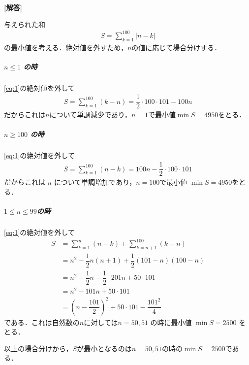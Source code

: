 \documentclass[../../main.tex]{subfiles}
\begin{document}
\begin{oframed}
  
\end{oframed}

{\bf [解答]}

与えられた和
\begin{align}
  S = \sum_{k=1}^{100} |n-k| \label{eq:1}
\end{align}
の最小値を考える．絶対値を外すため，$n$の値に応じて場合分けする．

\subparagraph{$n \le 1$ の時}

\cref{eq:1}の絶対値を外して
\begin{align}
  S
  = \sum_{k=1}^{100} (k-n)
  = \dfrac{1}{2} \cdot 100 \cdot 101 - 100 n
\end{align}
だからこれは$n$について単調減少であり，$n=1$で最小値$\min S = 4950$をとる．

\subparagraph{$n \ge 100$ の時}

\cref{eq:1}の絶対値を外して
\begin{align}
  S = \sum_{k=1}^{100} (n-k) = 100 n - \dfrac{1}{2} \cdot 100 \cdot 101
\end{align}
だからこれは $n$ について単調増加であり，$n=100$で最小値 $\min S = 4950$をとる．

\subparagraph{$1 \le n \le 99$の時}

\cref{eq:1}の絶対値を外して
\begin{align}
  S
  &= \sum_{k=1}^n (n-k) + \sum_{k=n+1}^{100} (k-n) \\
  &= n^2 - \dfrac{1}{2} n(n+1) + \dfrac{1}{2}(101-n)(100-n) \\
  &= n^2 - \dfrac{1}{2} n - \dfrac{1}{2} \cdot 201 n + 50 \cdot 101 \\
  &= n^2 - 101 n + 50 \cdot 101 \\
  &= \left(n - \dfrac{101}{2}\right)^2 + 50 \cdot 101 - \dfrac{101^2}{4}
\end{align}
である．これは自然数の$n$に対しては$n = 50, 51$ の時に最小値 $\min S = 2500$ をとる．
\casesend

以上の場合分けから，$S$が最小となるのは$n=50,51$の時の$\min S = 2500$である．

\newpage
\end{document}
